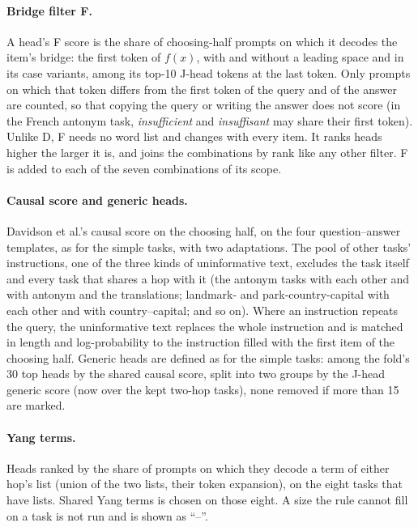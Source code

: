 \documentclass[10pt,a4paper]{article}
\begin{document}
\paragraph{Bridge filter F.} A head's F score is the share of choosing-half prompts on which it decodes the item's bridge: the first token of $f(x)$, with and without a leading space and in its case variants, among its top-10 J-head tokens at the last token. Only prompts on which that token differs from the first token of the query and of the answer are counted, so that copying the query or writing the answer does not score (in the French antonym task, \emph{insufficient} and \emph{insuffisant} may share their first token). Unlike D, F needs no word list and changes with every item. It ranks heads higher the larger it is, and joins the combinations by rank like any other filter. F is added to each of the seven combinations of its scope.

\paragraph{Causal score and generic heads.} Davidson et al.'s causal score on the choosing half, on the four question--answer templates, as for the simple tasks, with two adaptations. The pool of other tasks' instructions, one of the three kinds of uninformative text, excludes the task itself and every task that shares a hop with it (the antonym tasks with each other and with antonym and the translations; landmark- and park-country-capital with each other and with country--capital; and so on). Where an instruction repeats the query, the uninformative text replaces the whole instruction and is matched in length and log-probability to the instruction filled with the first item of the choosing half. Generic heads are defined as for the simple tasks: among the fold's 30 top heads by the shared causal score, split into two groups by the J-head generic score (now over the kept two-hop tasks), none removed if more than 15 are marked.

\paragraph{Yang terms.} Heads ranked by the share of prompts on which they decode a term of either hop's list (union of the two lists, their token expansion), on the eight tasks that have lists. Shared Yang terms is chosen on those eight. A size the rule cannot fill on a task is not run and is shown as ``--''.
\end{document}
